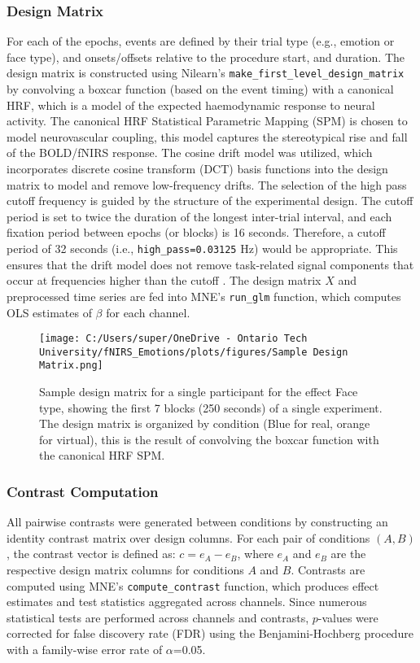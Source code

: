 \subsubsection{Design Matrix}
For each of the epochs, events are defined by their trial type (e.g., emotion or face type), and onsets/offsets relative to the procedure start, and duration.
The design matrix is constructed using Nilearn's \texttt{make\_first\_level\_design\_matrix} by convolving a boxcar function (based on the event timing) with a canonical HRF, which is a model of the expected haemodynamic response to neural activity.
The canonical HRF Statistical Parametric Mapping (SPM) \citep{friston_statistical_2007} is chosen to model neurovascular coupling, this model captures the stereotypical rise and fall of the BOLD/fNIRS response. 
The cosine drift model was utilized, which incorporates discrete cosine transform (DCT) basis functions into the design matrix to model and remove low-frequency drifts.
The selection of the high pass cutoff frequency is guided by the structure of the experimental design. 
The cutoff period is set to twice the duration of the longest inter-trial interval, and each fixation period between epochs (or blocks) is 16 seconds. 
Therefore, a cutoff period of 32 seconds (i.e., \texttt{high\_pass=0.03125} Hz) would be appropriate. 
This ensures that the drift model does not remove task-related signal components that occur at frequencies higher than the cutoff \citep{luke_analysis_2021}.
The design matrix \( X \) and preprocessed time series are fed into MNE's \texttt{run\_glm} function, which computes OLS estimates of \( \beta \) for each channel.

\begin{figure}[H]
    \centering
    \texttt{[image: C:/Users/super/OneDrive - Ontario Tech University/fNIRS\_Emotions/plots/figures/Sample Design Matrix.png]}
    \caption{Sample design matrix for a single participant for the effect Face type, showing the first 7 blocks (250 seconds) of a single experiment.
    The design matrix is organized by condition (Blue for real, orange for virtual), this is the result of convolving the boxcar function with the canonical HRF SPM. }
    \label{fig:design_matrix}
\end{figure}

\subsubsection{Contrast Computation}
\label{sec:contrast_computation}
All pairwise contrasts were generated between conditions by constructing an identity contrast matrix over design columns. 
For each pair of conditions \( (A, B) \), the contrast vector is defined as: $c = e_A - e_B$, where \( e_A \) and \( e_B \) are the respective design matrix columns for conditions \( A \) and \( B \). 
Contrasts are computed using MNE's \texttt{compute\_contrast} function, which produces effect estimates and test statistics aggregated across channels.
Since numerous statistical tests are performed across channels and contrasts, $p$-values were corrected for false discovery rate (FDR) using the Benjamini-Hochberg procedure \citep{singh_exploring_2006} with a family-wise error rate of $\alpha$=0.05.

